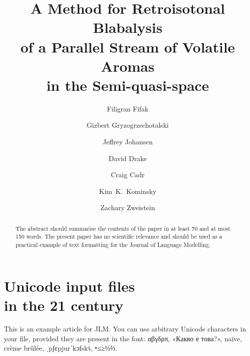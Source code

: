 \documentclass[
    anonymous,
]{jlm}
\begin{document}
\title{A Method for Retroisotonal Blabalysis\\ of a Parallel
  Stream of Volatile Aromas\\
  in the Semi-quasi-space}



\author{Filigran Fifak
  \and Gizbert Gryzogrzechotalski
  \and Jeffrey Johansen
  \and David Drake
  \and Craig Cadr
  \and Kim~K.~Kominsky
  \and Zachary Zweistein
}





\maketitle              %

\begin{abstract}
  The abstract should summarise the contents of the paper in at least
  70 and at most 150 words.  The present paper has no scientific
  relevance and should be used as a practical example of text
  formatting for the Journal of Language Modelling.
\end{abstract}

\section{Unicode input files\\ in the 21 century}

This is an example article for JLM.  You can use arbitrary Unicode
characters in your file, provided they are present in the font:
αβγδρπ, «Какво е това?», naïve, crème brûlée, ˌpʃɛpjurˈkɔfskʲi,
‣≤≥⅓⅔.
\end{document}
